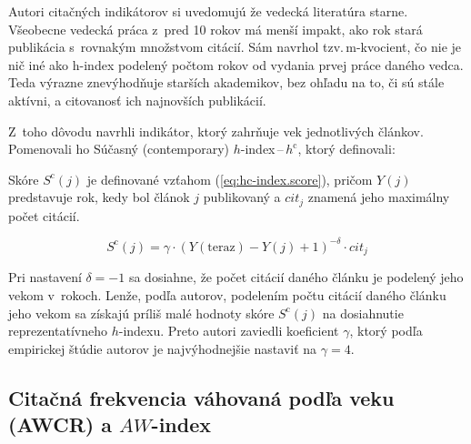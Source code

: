 Autori citačných indikátorov si uvedomujú že vedecká literatúra starne.
Všeobecne vedecká práca z~pred 10 rokov má menší impakt, ako rok stará
publikácia s~rovnakým množstvom citácií.  Sám \citet{Hirsch2005} navrhol
tzv.\,m-kvocient, čo nie je nič iné ako h-index podelený počtom rokov od vydania
prvej práce daného vedca.  Teda výrazne znevýhodňuje starších akademikov, bez
ohľadu na to, či sú stále aktívni, a citovanosť ich najnovších publikácií.

Z~toho dôvodu \citet{Sidiropoulos2007} navrhli indikátor, ktorý zahrňuje vek
jednotlivých článkov.  Pomenovali ho Súčasný (contemporary) $h$-index\,--\,$h^{\mathrm{c}}$,
ktorý definovali:


Skóre $S^{\mathrm{c}}(j)$ je definované vzťahom (\ref{eq:hc-index.score}), pričom $Y(j)$
predstavuje rok, kedy bol článok $j$ publikovaný a $\mathit{cit}_j$ znamená jeho
maximálny počet citácií.

\begin{equation}
\label{eq:hc-index.score}
S^{\mathrm{c}}(j) = \gamma\cdot (Y(\mathrm{teraz}) - Y(j) + 1)^{-\delta}\cdot \mathit{cit}_j
\end{equation}

Pri nastavení $\delta = -1$ sa dosiahne, že počet citácií daného článku je
podelený jeho vekom v~rokoch.  Lenže, podľa autorov, podelením počtu citácií
daného článku jeho vekom sa získajú príliš malé hodnoty skóre
$S^{\mathrm{c}}(j)$ na dosiahnutie reprezentatívneho $h$-indexu.  Preto autori
zaviedli koeficient $\gamma$, ktorý podľa empirickej štúdie autorov je
najvýhodnejšie  nastaviť na $\gamma = 4$.

\subsection{Citačná frekvencia váhovaná podľa veku (AWCR) a $\mathit{AW}$-index}
\label{sec:aw-index}

